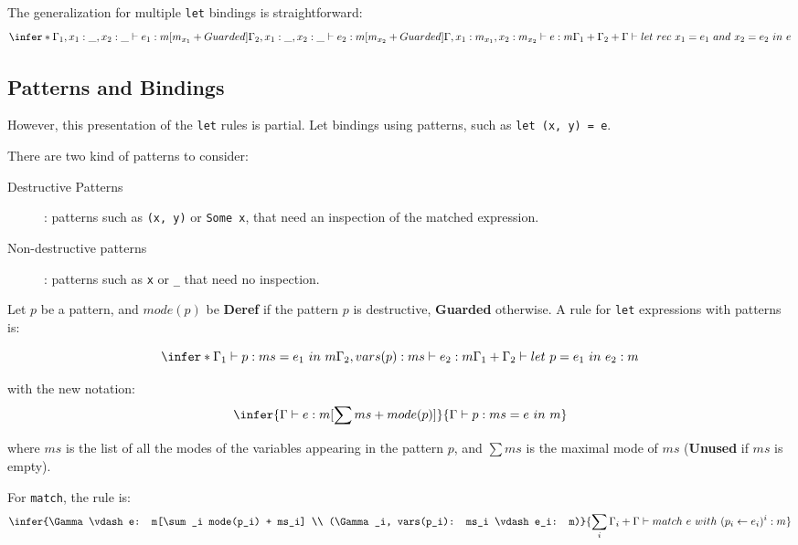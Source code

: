 \documentclass{article}
\begin{document}
The generalization for multiple \verb"let" bindings is straightforward:
\begin{displaymath}
  \infer*{\Gamma_1, x_1: \_, x_2: \_ \vdash e_1: m[m_{x_1} + Guarded] \\\\
          \Gamma_2, x_1: \_, x_2: \_ \vdash e_2: m[m_{x_2} + Guarded] \\\\
          \Gamma, x_1: m_{x_1}, x_2: m_{x_2} \vdash e: m}
         {\Gamma_1 + \Gamma_2 + \Gamma \vdash
          let~rec~x_1 = e_1~and~x_2 = e_2~in~e}
\end{displaymath}

\subsection{Patterns and Bindings}
However, this presentation of the \verb"let" rules is partial. Let bindings
using patterns, such as \verb"let (x, y) = e".

There are two kind of patterns to consider:
\begin{description}
  \item[Destructive Patterns]: patterns such as \verb"(x, y)" or \verb"Some x",
    that need an inspection of the matched expression.
  \item[Non-destructive patterns]: patterns such as \verb"x" or \verb"_" that
    need no inspection.
\end{description}

Let $p$ be a pattern, and $mode(p)$ be \textbf{Deref} if the pattern $p$ is
destructive, \textbf{Guarded} otherwise. A rule for \verb"let" expressions with
patterns is:

\begin{displaymath}
  \infer*{\Gamma_1 \vdash p: ms=e_1~in~m \\
          \Gamma_2, vars(p): ms \vdash e_2: m}
         {\Gamma_1 + \Gamma_2 \vdash let~p=e_1~in~e_2: m}
\end{displaymath}

with the new notation:
\begin{displaymath}
  \infer{\Gamma \vdash e: m[\sum ms + mode(p)]}
        {\Gamma \vdash p:ms=e~in~m}
\end{displaymath}

where $ms$ is the list of all the modes of the variables appearing in the
pattern $p$, and $\sum ms$ is the maximal mode of $ms$ (\textbf{Unused} if $ms$
is empty).

For \verb"match", the rule is:
\begin{displaymath}
  \infer{\Gamma \vdash e: m[\sum_i mode(p_i) + ms_i] \\
         (\Gamma_i, vars(p_i): ms_i \vdash e_i: m)}
        {\sum_i \Gamma_i + \Gamma \vdash
         match~e~with~(p_i \leftarrow e_i)^i: m}
\end{displaymath}



\end{document}
